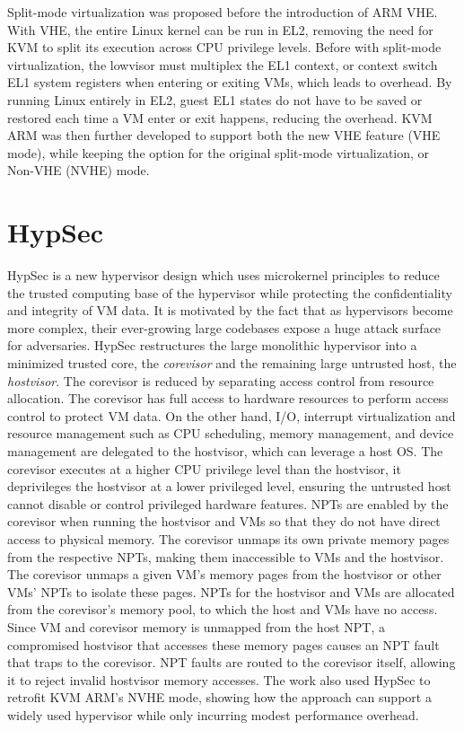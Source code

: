 Split-mode virtualization was proposed before the introduction of ARM VHE. With
VHE, the entire Linux kernel can be run in EL2, removing the need for KVM to
split its execution across CPU privilege levels. Before with split-mode
virtualization, the lowvisor must multiplex the EL1 context, or context switch
EL1 system registers when entering or exiting VMs, which leads to overhead. By
running Linux entirely in EL2, guest EL1 states do not have to be saved or
restored each time a VM enter or exit happens, reducing the overhead. KVM ARM
was then further developed to support both the new VHE feature (VHE mode),
while keeping the option for the original split-mode virtualization, or Non-VHE
(NVHE) mode.

\section{HypSec}

HypSec is a new hypervisor design which uses microkernel principles to reduce
the trusted computing base of the hypervisor while protecting the
confidentiality and integrity of VM data. It is motivated by the fact that as
hypervisors become more complex, their ever-growing large codebases expose a
huge attack surface for adversaries. HypSec restructures the large monolithic
hypervisor into a minimized trusted core, the \textit{corevisor} and the
remaining large untrusted host, the \textit{hostvisor}.
The corevisor is reduced by separating access control from resource allocation.
The corevisor has full access to hardware resources to perform access control
to protect VM data.
On the other hand, I/O, interrupt virtualization and resource management such
as CPU scheduling, memory management, and device management are delegated to
the hostvisor, which can leverage a host OS.
The corevisor executes at a higher CPU privilege level than the hostvisor,
it deprivileges the hostvisor at a lower privileged level, ensuring
the untrusted host cannot disable or control privileged hardware features.
NPTs are enabled by the corevisor when running the hostvisor and VMs so that
they do not have direct access to physical memory.
The corevisor unmaps its own private memory pages from the respective NPTs,
making them inaccessible to VMs and the hostvisor. The corevisor unmaps a given
VM's memory pages from the hostvisor or other VMs' NPTs to isolate these pages.
NPTs for the hostvisor and VMs are allocated from the corevisor's memory pool,
to which the host and VMs have no access. Since VM and corevisor memory is
unmapped from the host NPT, a compromised hostvisor that accesses these memory
pages causes an NPT fault that traps to the corevisor. NPT faults are routed to
the corevisor itself, allowing it to reject invalid hostvisor memory accesses.
The work also used HypSec to retrofit KVM ARM's NVHE mode, showing how the
approach can support a widely used hypervisor while only incurring modest
performance overhead.


